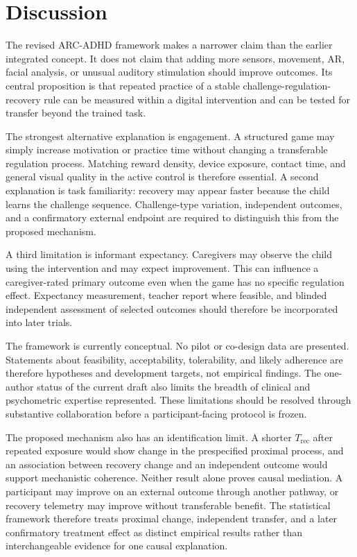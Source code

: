 \section{Discussion}

The revised ARC-ADHD framework makes a narrower claim than the earlier integrated concept. It does not claim that adding more sensors, movement, AR, facial analysis, or unusual auditory stimulation should improve outcomes. Its central proposition is that repeated practice of a stable challenge-regulation-recovery rule can be measured within a digital intervention and can be tested for transfer beyond the trained task.

The strongest alternative explanation is engagement. A structured game may simply increase motivation or practice time without changing a transferable regulation process. Matching reward density, device exposure, contact time, and general visual quality in the active control is therefore essential. A second explanation is task familiarity: recovery may appear faster because the child learns the challenge sequence. Challenge-type variation, independent outcomes, and a confirmatory external endpoint are required to distinguish this from the proposed mechanism.

A third limitation is informant expectancy. Caregivers may observe the child using the intervention and may expect improvement. This can influence a caregiver-rated primary outcome even when the game has no specific regulation effect. Expectancy measurement, teacher report where feasible, and blinded independent assessment of selected outcomes should therefore be incorporated into later trials.

The framework is currently conceptual. No pilot or co-design data are presented. Statements about feasibility, acceptability, tolerability, and likely adherence are therefore hypotheses and development targets, not empirical findings. The one-author status of the current draft also limits the breadth of clinical and psychometric expertise represented. These limitations should be resolved through substantive collaboration before a participant-facing protocol is frozen.

The proposed mechanism also has an identification limit. A shorter \(T_{\mathrm{rec}}\) after repeated exposure would show change in the prespecified proximal process, and an association between recovery change and an independent outcome would support mechanistic coherence. Neither result alone proves causal mediation. A participant may improve on an external outcome through another pathway, or recovery telemetry may improve without transferable benefit. The statistical framework therefore treats proximal change, independent transfer, and a later confirmatory treatment effect as distinct empirical results rather than interchangeable evidence for one causal explanation.

